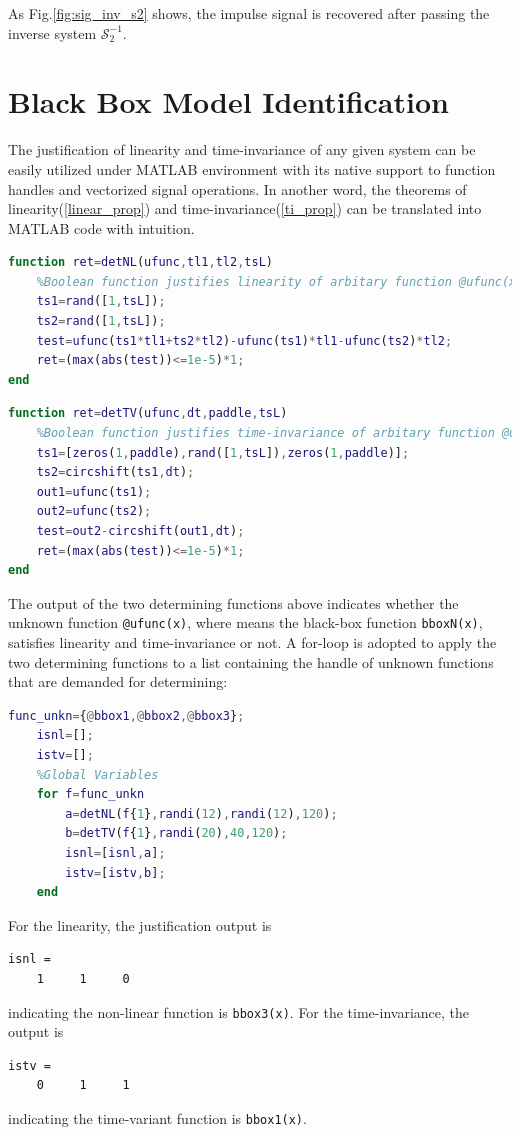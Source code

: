 \documentclass[conference]{IEEEtran}
\begin{document}
As Fig.\ref{fig:sig_inv_s2} shows, the impulse signal is recovered after passing the inverse system \(\mathcal{S}_{2}^{-1}\).

\section{Black Box Model Identification}

The justification of linearity and time-invariance of any given system can be easily utilized under MATLAB environment with its native support to function handles and vectorized signal operations. In another word, the theorems of linearity(\ref{linear_prop}) and time-invariance(\ref{ti_prop}) can be translated into MATLAB code with intuition.
\pagebreak
\begin{lstlisting}[language=matlab,style=matlab]
function ret=detNL(ufunc,tl1,tl2,tsL)
	%Boolean function justifies linearity of arbitary function @ufunc(x)
    ts1=rand([1,tsL]);
    ts2=rand([1,tsL]);
    test=ufunc(ts1*tl1+ts2*tl2)-ufunc(ts1)*tl1-ufunc(ts2)*tl2;
    ret=(max(abs(test))<=1e-5)*1;
end
\end{lstlisting}

\begin{lstlisting}[language=matlab,style=matlab]
function ret=detTV(ufunc,dt,paddle,tsL)
	%Boolean function justifies time-invariance of arbitary function @ufunc(x)
    ts1=[zeros(1,paddle),rand([1,tsL]),zeros(1,paddle)];
    ts2=circshift(ts1,dt);
    out1=ufunc(ts1);
    out2=ufunc(ts2);
    test=out2-circshift(out1,dt);
    ret=(max(abs(test))<=1e-5)*1;
end
\end{lstlisting}

The output of the two determining functions above indicates whether the unknown function \lstinline{@ufunc(x)}, where means the black-box function \lstinline{bboxN(x)}, satisfies linearity and time-invariance or not. A for-loop is adopted to apply the two determining functions to a list containing the handle of unknown functions that are demanded for determining:
\begin{lstlisting}[language=matlab,style=matlab]
	func_unkn={@bbox1,@bbox2,@bbox3};
	isnl=[];
	istv=[];
	%Global Variables
	for f=func_unkn
		a=detNL(f{1},randi(12),randi(12),120);
		b=detTV(f{1},randi(20),40,120);
		isnl=[isnl,a];
		istv=[istv,b];
	end
\end{lstlisting}

For the linearity, the justification output is
\begin{lstlisting}
isnl =
	1     1     0
\end{lstlisting}
indicating the non-linear function is \lstinline{bbox3(x)}. For the time-invariance, the output is
\begin{lstlisting}
istv =
	0     1     1
\end{lstlisting}
indicating the time-variant function is \lstinline{bbox1(x)}.
\end{document}
